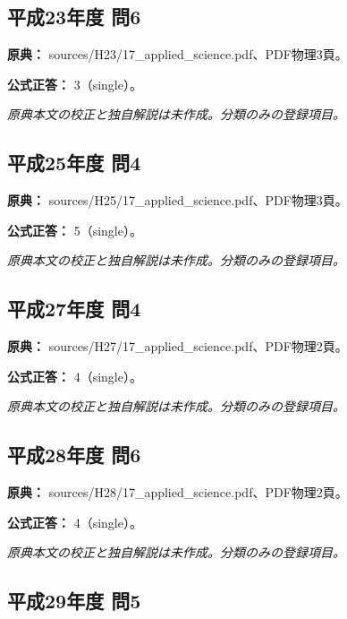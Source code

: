 \subsection{平成23年度 問6}
\label{q:h23-reg-applied-06}

\noindent\textbf{原典：} sources/H23/17\_applied\_science.pdf、PDF物理3頁。

\textbf{公式正答：} 3（single）。

\par\textit{原典本文の校正と独自解説は未作成。分類のみの登録項目。}

\subsection{平成25年度 問4}
\label{q:h25-reg-applied-04}

\noindent\textbf{原典：} sources/H25/17\_applied\_science.pdf、PDF物理3頁。

\textbf{公式正答：} 5（single）。

\par\textit{原典本文の校正と独自解説は未作成。分類のみの登録項目。}

\subsection{平成27年度 問4}
\label{q:h27-reg-applied-04}

\noindent\textbf{原典：} sources/H27/17\_applied\_science.pdf、PDF物理2頁。

\textbf{公式正答：} 4（single）。

\par\textit{原典本文の校正と独自解説は未作成。分類のみの登録項目。}

\subsection{平成28年度 問6}
\label{q:h28-reg-applied-06}

\noindent\textbf{原典：} sources/H28/17\_applied\_science.pdf、PDF物理2頁。

\textbf{公式正答：} 4（single）。

\par\textit{原典本文の校正と独自解説は未作成。分類のみの登録項目。}

\subsection{平成29年度 問5}
\label{q:h29-reg-applied-05}

